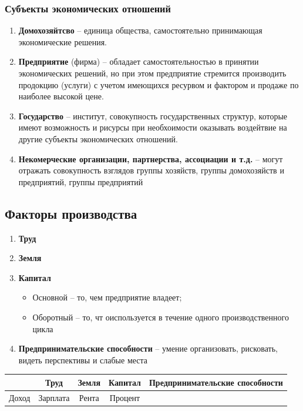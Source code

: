 \subsubsection{Субъекты экономических отношений}

\begin{enumerate}
    \item \textbf{Домохозяйтсво} -- единица общества, самостоятельно принимающая экономические решения.
    \item \textbf{Предприятие} (фирма) -- обладает самостоятельностью в принятии экономических решений, но при этом предприятие стремится производить продокцию (услуги) с учетом имеющихся ресурвом и фактором и продаже по наиболее высокой цене.
    \item \textbf{Государство} -- институт, совокупность государственных структур, которые имеют возможность и рисурсы при необхоимости оказывать воздейтвие на другие субъекты экономических отношений.
    \item \textbf{Некомерческие организации, партнерства, ассоциации и т.д.} -- могут отражать совокупность взглядов группы хозяйств, группы домохозяйств и предприятий, группы предприятий
\end{enumerate}

\subsection{Факторы производства}

\begin{enumerate}
    \item \textbf{Труд}
    \item \textbf{Земля}
    \item \textbf{Капитал}

        \begin{itemize}
            \item Основной -- то, чем предприятие владеет;
            \item Оборотный -- то, чт оиспользуется в течение одного производственного цикла
        \end{itemize}

    \item \textbf{Предпринимательские способности} -- умение организовать, рисковать, видеть перспективы и слабые места
\end{enumerate}

\begin{table}[H]
    \centering
    \begin{tabular}{|c|c|c|c|c|}
        \hline
            & Труд & Земля & Капитал & Предпринимательские способности \\
        \hline
        Доход & Зарплата & Рента & Процент & \\
        \hline
    \end{tabular}
\end{table}

